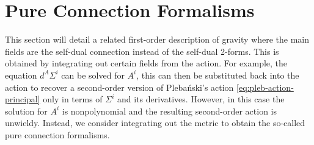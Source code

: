 \documentclass[10pt]{report}
\newcommand{\pleb}[0]{Pleba\'nski}
\theoremstyle{definition}
\begin{document}
\section{Pure Connection Formalisms}\label{sec:connection-formalism}
This section will detail a related first-order description of gravity where the main fields are the self-dual connection instead of the self-dual 2-forms. This is obtained by integrating out certain fields from the action. For example, the equation $d^A \Sigma^i$ can be solved for $A^i$, this can then be substituted back into the action to recover a second-order version of \pleb{}'s action \cref{eq:pleb-action-principal} only in terms of $\Sigma^i$ and its derivatives. However, in this case the solution for $A^i$ is nonpolynomial and the resulting second-order action is unwieldy. Instead, we consider integrating out the metric to obtain the so-called pure connection formalisms.
\end{document}

